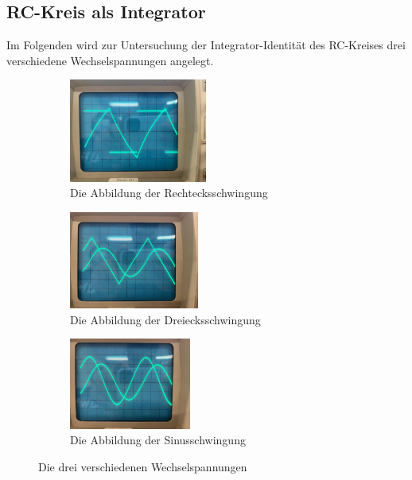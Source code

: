 \subsection{RC-Kreis als Integrator}

\begin{flushleft}
    Im Folgenden wird zur Untersuchung der Integrator-Identität des RC-Kreises drei verschiedene Wechselspannungen angelegt.
\end{flushleft}

\begin{figure}      
    \begin{subfigure}{0.60\textwidth}
        \centering
        \includegraphics[height=34mm]{bilder/3.jpeg}
        \caption{Die Abbildung der Rechtecksschwingung} 
        \label{Abbildung7a}
    \end{subfigure}
    \hfill
    \begin{subfigure}{0.60\textwidth}
        \centering
        \includegraphics[height=32mm]{bilder/4.jpeg}
        \caption{Die Abbildung der Dreiecksschwingung} 
        \label{Abbildung7b}
    \end{subfigure}
    \center
    \begin{subfigure}{0.60\textwidth}
        \centering
        \includegraphics[height=30mm]{bilder/2.jpeg}
        \caption{Die Abbildung der Sinusschwingung} 
        \label{Abbildung7c}
    \end{subfigure}
    \caption{Die drei verschiedenen Wechselspannungen}
    \label{Abbildung7}
\end{figure}
